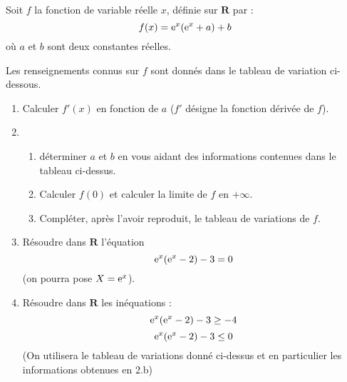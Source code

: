   Soit $f$ la fonction de variable réelle $x$, définie sur $\mathbf{R}$ par :
  \[
      f(x)=\mathrm{e}^x(\mathrm{e}^x+a)+b
  \]
  où $a$ et $b$ sont deux constantes réelles.

  Les renseignements connus sur $f$ sont donnés dans le tableau de variation ci-dessous.

  \medskip
  \begin{center}
  \end{center}

  \medskip
  \begin{enumerate}
      \item Calculer $f'(x)$ en fonction de $a$ ($f'$ désigne la fonction dérivée de $f$).
      \item \begin{enumerate}
             \item déterminer $a$ et $b$ en vous aidant des informations contenues dans le
              tableau ci-dessus.
             \item Calculer $f(0)$ et calculer la limite de $f$ en $+\infty$.
             \item Compléter, après l'avoir reproduit, le tableau de variations de $f$.
             \end{enumerate}
      \item Résoudre dans $\mathbf{R}$ l'équation
      \[
          \mathrm{e}^x(\mathrm{e}^x-2)-3=0
      \]
      (on pourra pose $X=\mathrm{e}^x$).
      \item Résoudre dans $\mathbf{R}$ les inéquations :
      \[
          \mathrm{e}^x(\mathrm{e}^x-2)-3\geq -4
      \]
      \[
          \mathrm{e}^x(\mathrm{e}^x-2)-3 \leq 0
      \]
       (On utilisera le tableau de variations donné ci-dessus et en particulier les
        informations obtenues en 2.b)
  \end{enumerate}

